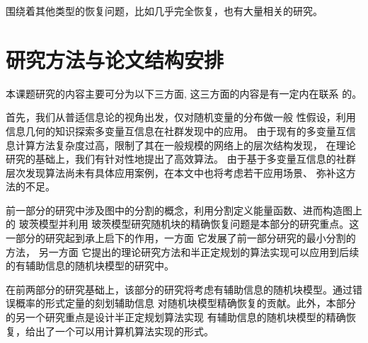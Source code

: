 围绕着其他类型的恢复问题，比如几乎完全恢复，也有大量相关的研究\cite{kanade2016global, deshpande2018contextual}。

\section{研究方法与论文结构安排}
本课题研究的内容主要可分为以下三方面, 这三方面的内容是有一定内在联系
的。

首先，我们从普适信息论的视角出发，仅对随机变量的分布做一般
性假设，利用信息几何的知识探索多变量互信息在社群发现中的应用。
由于现有的多变量互信息计算方法复杂度过高，限制了其在一般规模的网络上的层次结构发现，
在理论研究的基础上，我们有针对性地提出了高效算法。
由于基于多变量互信息的社群层次发现算法尚未有具体应用案例，在本文中也将考虑若干应用场景、
弥补这方法的不足。
 
前一部分的研究中涉及图中的分割的概念，利用分割定义能量函数、进而构造图上的 玻茨模型并利用
玻茨模型研究随机块的精确恢复问题是本部分的研究重点。这一部分的研究起到承上启下的作用，一方面
它发展了前一部分研究的最小分割的方法，
另一方面
它提出的理论研究方法和半正定规划的算法实现可以应用到后续的有辅助信息的随机块模型的研究中。

在前两部分的研究基础上，该部分的研究将考虑有辅助信息的随机块模型。通过错误概率的形式定量的刻划辅助信息
对随机块模型精确恢复的贡献。此外，本部分的另一个研究重点是设计半正定规划算法实现
有辅助信息的随机块模型的精确恢复，给出了一个可以用计算机算法实现的形式。
